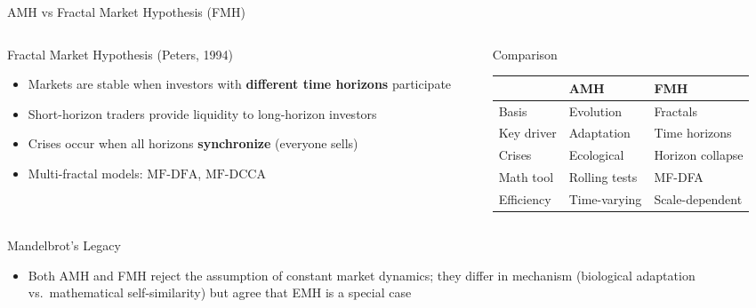 \documentclass[9pt, aspectratio=169, t]{beamer}
\theoremstyle{definition}
\newenvironment{cminipage}[1]{%
    \par\noindent\hfill\begin{minipage}{#1}\ignorespaces
}{%
    \end{minipage}\hfill\null\par
}
\begin{document}
\begin{frame}{AMH vs Fractal Market Hypothesis (FMH)}
\begin{cminipage}{0.95\textwidth}
\small
\begin{columns}[T]
\begin{column}{0.48\textwidth}
\begin{block}{Fractal Market Hypothesis (Peters, 1994)}
\begin{itemize}\setlength{\itemsep}{0pt}
    \item Markets are stable when investors with \textbf{different time horizons} participate
    \item Short-horizon traders provide liquidity to long-horizon investors
    \item Crises occur when all horizons \textbf{synchronize} (everyone sells)
    \item Multi-fractal models: $\text{MF-DFA}$, $\text{MF-DCCA}$
\end{itemize}
\end{block}
\end{column}
\begin{column}{0.48\textwidth}
\begin{block}{Comparison}
\footnotesize
\renewcommand{\arraystretch}{1.1}
\begin{tabular}{lll}
\toprule
& \textbf{AMH} & \textbf{FMH} \\
\midrule
Basis & Evolution & Fractals \\
Key driver & Adaptation & Time horizons \\
Crises & Ecological & Horizon collapse \\
Math tool & Rolling tests & MF-DFA \\
Efficiency & Time-varying & Scale-dependent \\
\bottomrule
\end{tabular}
\end{block}
\end{column}
\end{columns}

\vspace{0.1cm}
\begin{alertblock}{Mandelbrot's Legacy}
\begin{itemize}\setlength{\itemsep}{0pt}
    \item Both AMH and FMH reject the assumption of constant market dynamics; they differ in mechanism (biological adaptation vs.\ mathematical self-similarity) but agree that EMH is a special case
\end{itemize}
\end{alertblock}
\end{cminipage}
\end{frame}
\end{document}
